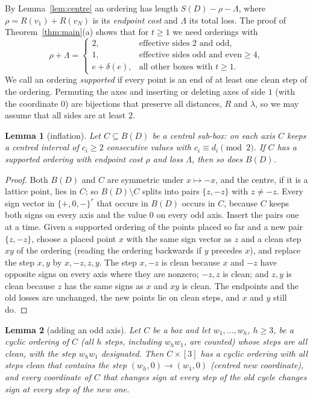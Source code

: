 \documentclass[11pt]{article}
\newtheorem{lemma}{Lemma}
\theoremstyle{remark}
\begin{document}
By Lemma~\ref{lem:centre} an ordering has length $S(D)-\rho-\Lambda$, where
$\rho=R(v_1)+R(v_N)$ is its \emph{endpoint cost} and $\Lambda$ its total loss.
The proof of Theorem~\ref{thm:main}(a) shows that for $t\ge1$ we need
orderings with
\begin{equation}\label{eq:target}
\rho+\Lambda=\begin{cases}
2,& \text{effective sides }2\text{ and odd},\\
1,& \text{effective sides odd and even}\ge4,\\
e+\delta(e),&\text{all other boxes with }t\ge1.
\end{cases}
\end{equation}
We call an ordering \emph{supported} if every point is an end of at least one
clean step of the ordering. Permuting the axes and inserting or deleting axes
of side $1$ (with the coordinate $0$) are bijections that preserve all
distances, $R$ and $\lambda$, so we may assume that all sides are at least $2$.

\begin{lemma}[inflation]\label{lem:inflate}
Let $C\subseteq B(D)$ be a central sub-box: on each axis $C$ keeps a centred
interval of $c_i\ge2$ consecutive values with $c_i\equiv d_i\pmod 2$. If $C$
has a supported ordering with endpoint cost $\rho$ and loss $\Lambda$, then so
does $B(D)$.
\end{lemma}

\begin{proof}
Both $B(D)$ and $C$ are symmetric under $x\mapsto-x$, and the centre, if it is
a lattice point, lies in $C$; so $B(D)\setminus C$ splits into pairs
$\{z,-z\}$ with $z\ne-z$. Every sign vector in $\{+,0,-\}^r$ that occurs in
$B(D)$ occurs in $C$, because $C$ keeps both signs on every axis and the value
$0$ on every odd axis. Insert the pairs one at a time. Given a supported
ordering of the points placed so far and a new pair $\{z,-z\}$, choose a placed
point $x$ with the same sign vector as $z$ and a clean step $xy$ of the
ordering (reading the ordering backwards if $y$ precedes $x$), and replace the
step $x,y$ by $x,-z,z,y$. The step $x,-z$ is clean because $x$ and $-z$ have
opposite signs on every axis where they are nonzero; $-z,z$ is clean; and $z,y$
is clean because $z$ has the same signs as $x$ and $xy$ is clean. The endpoints
and the old losses are unchanged, the new points lie on clean steps, and $x$
and $y$ still do.
\end{proof}

\begin{lemma}[adding an odd axis]\label{lem:odd}
Let $C$ be a box and let $w_1,\dots,w_h$, $h\ge3$, be a cyclic ordering of
$C$ (all $h$ steps, including $w_hw_1$, are counted) whose steps are all clean,
with the step $w_h w_1$ designated. Then $C\times[3]$ has a cyclic ordering with
all steps clean that contains the step $(w_h,0)\to(w_1,0)$ (centred new
coordinate), and every coordinate of $C$ that changes sign at every step of the
old cycle changes sign at every step of the new one.
\end{lemma}
\end{document}
